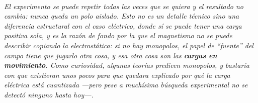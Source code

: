 \begin{center}
\\[0.5em]
{\small\itshape El experimento se puede repetir todas las veces que se quiera y
el resultado no cambia: nunca queda un polo aislado. Esto no es un detalle
técnico sino una diferencia estructural con el caso eléctrico, donde sí se puede
tener una carga positiva sola, y es la razón de fondo por la que el magnetismo
no se puede describir copiando la electrostática: si no hay monopolos, el papel
de \enquote{fuente} del campo tiene que jugarlo otra cosa, y esa otra cosa son
las \textbf{cargas en movimiento}. Como curiosidad, algunas teorías predicen
monopolos, y bastaría con que existieran unos pocos para que quedara explicado
por qué la carga eléctrica está cuantizada ---pero pese a muchísima búsqueda
experimental no se detectó ninguno hasta hoy---.}
\end{center}
